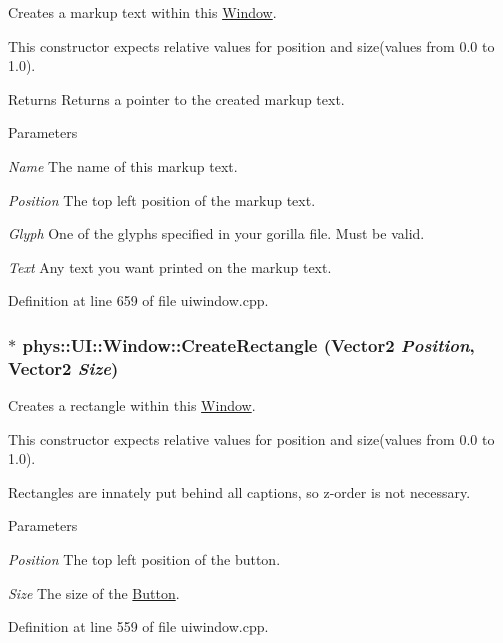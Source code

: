 Creates a markup text within this \hyperlink{classphys_1_1UI_1_1Window}{Window}. 

This constructor expects relative values for position and size(values from 0.0 to 1.0). \begin{DoxyReturn}{Returns}
Returns a pointer to the created markup text. 
\end{DoxyReturn}

\begin{DoxyParams}{Parameters}
\item[{\em Name}]The name of this markup text. \item[{\em Position}]The top left position of the markup text. \item[{\em Glyph}]One of the glyphs specified in your gorilla file. Must be valid. \item[{\em Text}]Any text you want printed on the markup text. \end{DoxyParams}


Definition at line 659 of file uiwindow.cpp.

\hypertarget{classphys_1_1UI_1_1Window_a16bd1a1a35d61c597bca648e127aaf3a}{
\subsubsection[{CreateRectangle}]{ $\ast$ phys::UI::Window::CreateRectangle ({\bf Vector2} {\em Position}, \/  {\bf Vector2} {\em Size})}}
\label{d4/d86/classphys_1_1UI_1_1Window_a16bd1a1a35d61c597bca648e127aaf3a}


Creates a rectangle within this \hyperlink{classphys_1_1UI_1_1Window}{Window}. 

This constructor expects relative values for position and size(values from 0.0 to 1.0). \par
 Rectangles are innately put behind all captions, so z-\/order is not necessary. 
\begin{DoxyParams}{Parameters}
\item[{\em Position}]The top left position of the button. \item[{\em Size}]The size of the \hyperlink{classphys_1_1UI_1_1Button}{Button}. \end{DoxyParams}


Definition at line 559 of file uiwindow.cpp.

